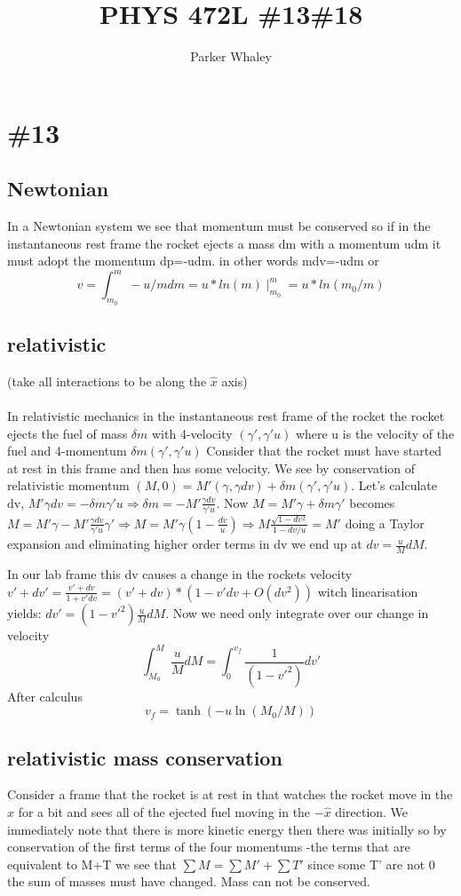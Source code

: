 \documentclass[11pt,a4paper]{article}
\author{Parker Whaley}
\title{PHYS 472L \#13\#18}
\begin{document}
\maketitle

\section{\#13}
\subsection{Newtonian}
In a Newtonian system we see that momentum must be conserved so if in the instantaneous rest frame the rocket ejects a mass dm with a momentum udm it must adopt the momentum dp=-udm.  in other words mdv=-udm or \[v=\int_{m_0}^m-u/m dm=u*ln(m)\mid_{m_0}^m=u*ln(m_0/m)\]
\subsection{relativistic}
(take all interactions to be along the $\hat{x}$ axis)\\\\
In relativistic mechanics in the instantaneous rest frame of the rocket the rocket ejects the fuel of mass $\delta m$ with 4-velocity $(\gamma',\gamma'u)$ where u is the velocity of the fuel and 4-momentum $\delta m(\gamma',\gamma'u)$ Consider that the rocket must have started at rest in this frame and then has some velocity.  We see by conservation of relativistic momentum $(M,0)=M'(\gamma,\gamma dv)+\delta m(\gamma',\gamma'u)$.  Let's calculate dv, $M'\gamma dv=-\delta m \gamma'u\Rightarrow \delta m=-M'\frac{\gamma dv}{\gamma'u}$.  Now $M=M'\gamma+\delta m\gamma'$ becomes $M=M'\gamma-M'\frac{\gamma dv}{\gamma'u}\gamma'\Rightarrow M=M'\gamma(1-\frac{dv}{u})\Rightarrow M\frac{\sqrt{1-dv^2}}{1-dv/u}=M'$ doing a Taylor expansion and eliminating higher order terms in dv we end up at $dv=\frac{u}{M}dM$.



In our lab frame this dv causes a change in the rockets velocity $v'+dv'=\frac{v'+dv}{1+v'dv}=(v'+dv)*(1-v'dv+O(dv^2))$ witch linearisation yields: $dv'=(1-v'^2)\frac{u}{M}dM$.  Now we need only integrate over our change in velocity \[\int_{M_0}^{M}\frac{u}{M}dM=\int^{v_f}_{0}\frac{1}{(1-v'^2)}dv'\]After calculus \[v_f=\tanh(-u\ln(M_0/M))\]

\subsection{relativistic mass conservation}
Consider a frame that the rocket is at rest in that watches the rocket move in the $\hat{x}$ for a bit and sees all of the ejected fuel moving in the $-\hat{x}$ direction.  We immediately note that there is more kinetic energy then there was initially so by conservation of the first terms of the four momentums -the terms that are equivalent to M+T we see that $\sum M=\sum M'+\sum T'$ since some T' are not 0 the sum of masses must have changed.  Mass can not be conserved.
\end{document}

